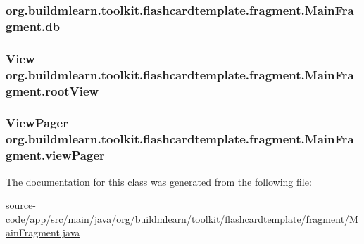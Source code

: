 \subsubsection[{\texorpdfstring{db}{db}}]{ org.\+buildmlearn.\+toolkit.\+flashcardtemplate.\+fragment.\+Main\+Fragment.\+db\hspace{0.3cm}{\ttfamily [private]}}\hypertarget{classorg_1_1buildmlearn_1_1toolkit_1_1flashcardtemplate_1_1fragment_1_1MainFragment_a86daf85504137e7729d6f44a397da9c8}{}\label{classorg_1_1buildmlearn_1_1toolkit_1_1flashcardtemplate_1_1fragment_1_1MainFragment_a86daf85504137e7729d6f44a397da9c8}
\subsubsection[{\texorpdfstring{root\+View}{rootView}}]{\setlength{\rightskip}{0pt plus 5cm}View org.\+buildmlearn.\+toolkit.\+flashcardtemplate.\+fragment.\+Main\+Fragment.\+root\+View\hspace{0.3cm}{\ttfamily [private]}}\hypertarget{classorg_1_1buildmlearn_1_1toolkit_1_1flashcardtemplate_1_1fragment_1_1MainFragment_ad77ae56af19a9427dcc1b78dd9dded5d}{}\label{classorg_1_1buildmlearn_1_1toolkit_1_1flashcardtemplate_1_1fragment_1_1MainFragment_ad77ae56af19a9427dcc1b78dd9dded5d}
\subsubsection[{\texorpdfstring{view\+Pager}{viewPager}}]{\setlength{\rightskip}{0pt plus 5cm}View\+Pager org.\+buildmlearn.\+toolkit.\+flashcardtemplate.\+fragment.\+Main\+Fragment.\+view\+Pager\hspace{0.3cm}{\ttfamily [private]}}\hypertarget{classorg_1_1buildmlearn_1_1toolkit_1_1flashcardtemplate_1_1fragment_1_1MainFragment_aec1637ba8fbe69945ea7f675b5472293}{}\label{classorg_1_1buildmlearn_1_1toolkit_1_1flashcardtemplate_1_1fragment_1_1MainFragment_aec1637ba8fbe69945ea7f675b5472293}


The documentation for this class was generated from the following file\+:\begin{DoxyCompactItemize}
\item 
source-\/code/app/src/main/java/org/buildmlearn/toolkit/flashcardtemplate/fragment/\hyperlink{flashcardtemplate_2fragment_2MainFragment_8java}{Main\+Fragment.\+java}\end{DoxyCompactItemize}
